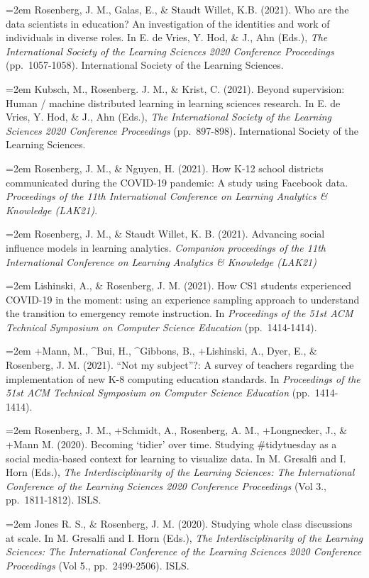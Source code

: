 \documentclass[
  14,
]{article}
\begin{document}
\hangindent=2em Rosenberg, J. M., Galas, E., \& Staudt Willet, K.B.
(2021). Who are the data scientists in education? An investigation of
the identities and work of individuals in diverse roles. In E. de Vries,
Y. Hod, \& J., Ahn (Eds.), \emph{The International Society of the
Learning Sciences 2020 Conference Proceedings} (pp.~1057-1058).
International Society of the Learning Sciences.

\hangindent=2em Kubsch, M., Rosenberg. J. M., \& Krist, C. (2021).
Beyond supervision: Human / machine distributed learning in learning
sciences research. In E. de Vries, Y. Hod, \& J., Ahn (Eds.), \emph{The
International Society of the Learning Sciences 2020 Conference
Proceedings} (pp.~897-898). International Society of the Learning
Sciences.

\hangindent=2em Rosenberg, J. M., \& Nguyen, H. (2021). How K-12 school
districts communicated during the COVID-19 pandemic: A study using
Facebook data. \emph{Proceedings of the 11th International Conference on
Learning Analytics \& Knowledge (LAK21)}.

\hangindent=2em Rosenberg, J. M., \& Staudt Willet, K. B. (2021).
Advancing social influence models in learning analytics. \emph{Companion
proceedings of the 11th International Conference on Learning Analytics
\& Knowledge (LAK21)}

\hangindent=2em Lishinski, A., \& Rosenberg, J. M. (2021). How CS1
students experienced COVID-19 in the moment: using an experience
sampling approach to understand the transition to emergency remote
instruction. In \emph{Proceedings of the 51st ACM Technical Symposium on
Computer Science Education} (pp.~1414-1414).

\hangindent=2em +Mann, M., \^{}Bui, H., \^{}Gibbons, B., +Lishinski, A.,
Dyer, E., \& Rosenberg, J. M. (2021). ``Not my subject''?: A survey of
teachers regarding the implementation of new K-8 computing education
standards. In \emph{Proceedings of the 51st ACM Technical Symposium on
Computer Science Education} (pp.~1414-1414).

\hangindent=2em Rosenberg, J. M., +Schmidt, A., Rosenberg, A. M.,
+Longnecker, J., \& +Mann M. (2020). Becoming `tidier' over time.
Studying \#tidytuesday as a social media-based context for learning to
visualize data. In M. Gresalfi and I. Horn (Eds.), \emph{The
Interdisciplinarity of the Learning Sciences: The International
Conference of the Learning Sciences 2020 Conference Proceedings} (Vol
3., pp.~1811-1812). ISLS.

\hangindent=2em Jones R. S., \& Rosenberg, J. M. (2020). Studying whole
class discussions at scale. In M. Gresalfi and I. Horn (Eds.), \emph{The
Interdisciplinarity of the Learning Sciences: The International
Conference of the Learning Sciences 2020 Conference Proceedings} (Vol
5., pp.~2499-2506). ISLS.
\end{document}

